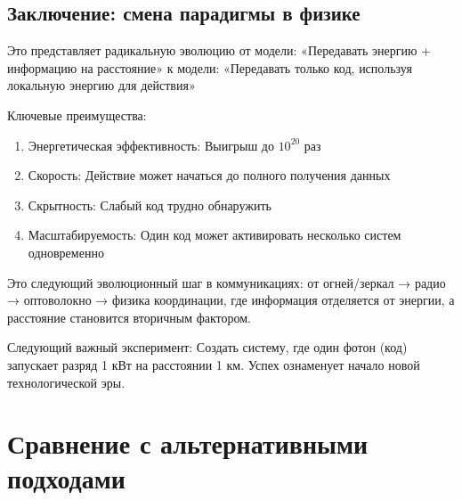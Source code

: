 \documentclass[11pt,a4paper]{article}
\begin{document}
	\subsection{Заключение: смена парадигмы в физике}
	
	Это представляет радикальную эволюцию от модели:
	«Передавать энергию + информацию на расстояние»
	к модели:
	«Передавать только код, используя локальную энергию для действия»
	
	Ключевые преимущества:
	\begin{enumerate}
		\item Энергетическая эффективность: Выигрыш до $10^{20}$ раз
		\item Скорость: Действие может начаться до полного получения данных
		\item Скрытность: Слабый код трудно обнаружить
		\item Масштабируемость: Один код может активировать несколько систем одновременно
	\end{enumerate}
	
	Это следующий эволюционный шаг в коммуникациях: от огней/зеркал → радио → оптоволокно → физика координации, где информация отделяется от энергии, а расстояние становится вторичным фактором.
	
	Следующий важный эксперимент: Создать систему, где один фотон (код) запускает разряд 1 кВт на расстоянии 1 км. Успех ознаменует начало новой технологической эры.
	\section{Сравнение с альтернативными подходами}
\end{document}
